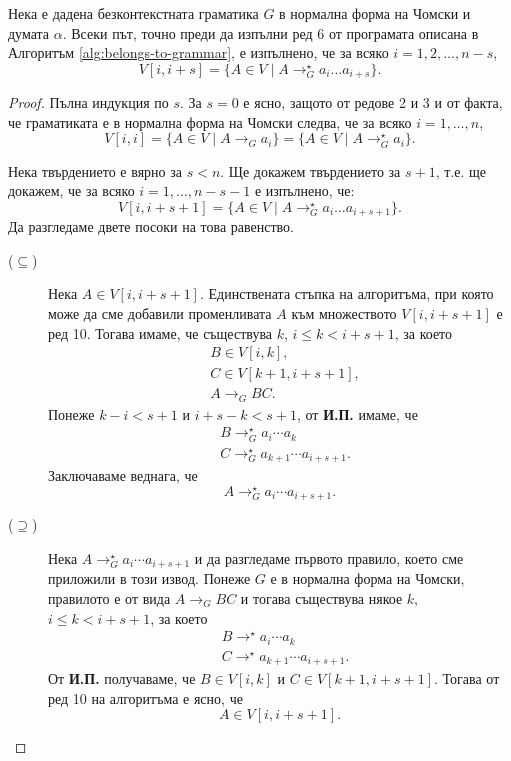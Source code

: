 \begin{lemma}
  Нека е дадена безконтекстната граматика $G$ в нормална форма на Чомски и думата $\alpha$.
  Всеки път, точно преди да изпълни ред 6 от програмата описана в Алгоритъм \ref{alg:belongs-to-grammar},
  е изпълнено, че за всяко $i = 1,2,\dots,n-s$,
  \[V[i,i+s] = \{A \in V \mid A \rightarrow^\star_G a_i\dots a_{i+s}\}.\]
\end{lemma}
\begin{proof}
  Пълна индукция по $s$.
  За $s = 0$ е ясно, защото от редове 2 и 3 и от факта, че граматиката е в нормална форма на Чомски следва, че за всяко $i = 1, \dots, n$,
  \[V[i,i] = \{A \in V \mid A \to_G a_i\} = \{A \in V \mid A \to^\star_G a_i\}.\]

  Нека твърдението е вярно за $s < n$. Ще докажем твърдението за $s+1$, т.е. ще докажем, че за всяко $i = 1,\dots,n-s-1$
  е изпълнено, че:
  \[V[i,i+s+1] = \{A \in V \mid A \rightarrow^\star_G a_i\dots a_{i+s+1}\}.\]
  Да разгледаме двете посоки на това равенство.
  \begin{description}
  \item[($\subseteq$)]
    Нека $A \in V[i,i+s+1]$.
    Единствената стъпка на алгоритъма, при която може да сме добавили променливата $A$ към множеството $V[i,i+s+1]$ е ред 10.
    Тогава имаме, че съществува $k$, $i \leq k < i+s+1$, за което
    \begin{align*}
      & B \in V[i,k],\\
      & C \in V[k+1,i+s+1],\\
      & A\to_G BC.
    \end{align*}
    Понеже $k-i < s+1$ и $i + s - k < s+1$, от {\bf И.П.} имаме, че
    \begin{align*}
      & B \to^\star_G a_i\cdots a_k\\
      & C \to^\star_G a_{k+1}\cdots a_{i+s+1}.
    \end{align*}
    Заключаваме веднага, че 
    \[A \to^\star_G a_i\cdots a_{i+s+1}.\]
  \item[($\supseteq$)]
    Нека $A \to^\star_G a_i\cdots a_{i+s+1}$ и да разгледаме първото правило, което сме приложили в този извод.
    Понеже $G$ е в нормална форма на Чомски, правилото е от вида $A \to_G BC$ и тогава съществува някое $k$, $i \leq k < i+s+1$, за което
    \begin{align*}
      & B \to^\star a_i\cdots a_{k}\\
      & C \to^\star a_{k+1}\cdots a_{i+s+1}.
    \end{align*}
    От {\bf И.П.} получаваме, че $B \in V[i,k]$ и $C \in V[k+1,i+s+1]$.
    Тогава от ред 10 на алгоритъма е ясно, че 
    \[A \in V[i,i+s+1].\]
  \end{description}
\end{proof}


